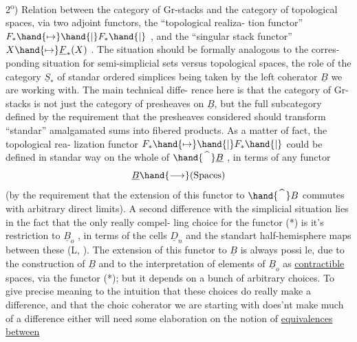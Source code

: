 2\textsuperscript{o}) Relation between the category of Gr-stacks and the category of
topological spaces, via two adjoint functors, the ``topological realiza-%
tion functor'' $F_{\ast} \hand{\mapsto} \hand{|}F_{\ast}\hand{|}$ , and the ``singular stack functor''
$X \hand{\mapsto} \underline{F}_{\ast}(X)$ . The situation should be formally analogous to the corres-%
ponding situation for semi-simplicial sets versus topological spaces,
the role of the category $\underline{S}_{\ast}$ of standar ordered simplices being taken
by the left coherator $\underline{B}$ we are working with. The main technical diffe-%
rence here is that the category of Gr-stacks is not just the category of
presheaves on $\underline{B}$, but the full subcategory defined by the requirement
that the presheaves considered should transform ``standar'' amalgamated
sums into fibered products. As a matter of fact, the topological rea-%
lization functor $F_{\ast} \hand{\mapsto} \hand{|}F_{\ast}\hand{|}$ could be defined in standar way on the
whole of $\hand{\widehat{\phantom{B}}}\underline{B}$ , in terms of any functor 
\hand{(*)} \[ \underline{B} \hand{\longrightarrow} \text{(Spaces)} \]
(by the requirement that the extension of this functor to $\hand{\widehat{\phantom{B}}}B$ commutes
with arbitrary direct limits). A second difference with the  simplicial
 situation  lies in the fact that the only really compel-%
ling choice for the functor (*) is it's restriction to $\underline{B}_o$ , in terms
of the cells $\underline{D}_n$ and the standart half-hemisphere  maps between
these (L, ). The extension of this functor to $\underline{B}$ is always possi%
le, due to the  construction of $\underline{B}$ and to the interpretation of elements
 of $\underline{B}_o$ as \uline{contractible} spaces, via the functor (*); but it depends on
a bunch of arbitrary choices. To give precise meaning to the intuition
that these choices do really make a difference, and that the choic
 coherator we are starting with does'nt make much of a difference either\hand{,}
will need some elaboration on the notion of \uline{equivalences between}
